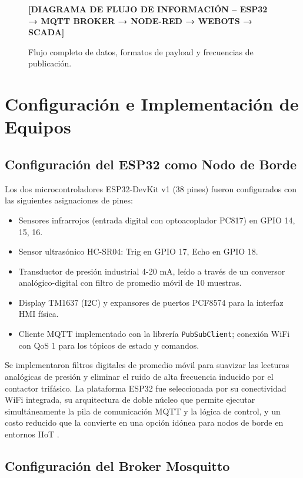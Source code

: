 \begin{figure}[htbp]
\centering
\textbf{[DIAGRAMA DE FLUJO DE INFORMACIÓN – ESP32 → MQTT BROKER → NODE-RED → WEBOTS → SCADA]}
\caption{Flujo completo de datos, formatos de payload y frecuencias de publicación.}
\label{fig:diag_flujo_info}
\end{figure}

\section{Configuración e Implementación de Equipos}

\subsection{Configuración del ESP32 como Nodo de Borde}

Los dos microcontroladores ESP32-DevKit v1 (38 pines) fueron configurados con las siguientes asignaciones de pines:
\begin{itemize}
    \item Sensores infrarrojos (entrada digital con optoacoplador PC817) en GPIO 14, 15, 16.
    \item Sensor ultrasónico HC-SR04: Trig en GPIO 17, Echo en GPIO 18.
    \item Transductor de presión industrial 4-20 mA, leído a través de un conversor analógico-digital con filtro de promedio móvil de 10 muestras.
    \item Display TM1637 (I2C) y expansores de puertos PCF8574 para la interfaz HMI física.
    \item Cliente MQTT implementado con la librería \texttt{PubSubClient}; conexión WiFi con QoS 1 para los tópicos de estado y comandos.
\end{itemize}

Se implementaron filtros digitales de promedio móvil para suavizar las lecturas analógicas de presión y eliminar el ruido de alta frecuencia inducido por el contactor trifásico. La plataforma ESP32 fue seleccionada por su conectividad WiFi integrada, su arquitectura de doble núcleo que permite ejecutar simultáneamente la pila de comunicación MQTT y la lógica de control, y un costo reducido que la convierte en una opción idónea para nodos de borde en entornos IIoT \cite{espressif2023}.

\subsection{Configuración del Broker Mosquitto}


